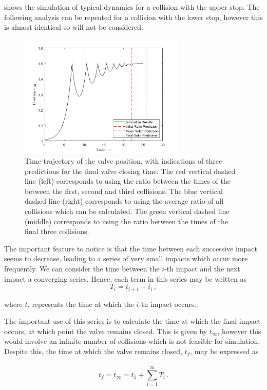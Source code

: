  shows the simulation of typical dynamics for a collision with the upper stop. The following analysis can be repeated for a collision with the lower stop, however this is almost identical so will not be considered.
~
\begin{figure}[ht]
    \centering
    \includegraphics[width=0.7\textwidth]{Figures/ImpactSeries/PositionTime.png}
    \caption{Time trajectory of the valve position, with indications of three predictions for the final valve closing time. The red vertical dashed line (left) corresponds to using the ratio between the times of the between the first, second and third collisions. The blue vertical dashed line (right) corresponds to using the average ratio of all collisions which can be calculated. The green vertical dashed line (middle) corresponds to using the ratio between the times of the final three collisions.}
    \label{fig: ImpactPos}
\end{figure}

The important feature to notice is that the time between each successive impact seems to decrease, leading to a series of very small impacts which occur more frequently. We can consider the time between the $i$-th impact and the next impact a converging series. Hence, each term in this series may be written as
~
\begin{equation*}
    T_i = t_{i+1} - t_{i} \, ,
\end{equation*}

where $t_i$ represents the time at which the $i$-th impact occurs.

The important use of this series is to calculate the time at which the final impact occurs, at which point the valve remains closed. This is given by $t_\infty$, however this would involve an infinite number of collisions which is not feasible for simulation. Despite this, the time at which the valve remains closed, $t_f$, may be expressed as
~
\begin{equation*}
    t_f = t_\infty = t_1 + \sum^\infty_{i = 1} T_i \, .
\end{equation*}

